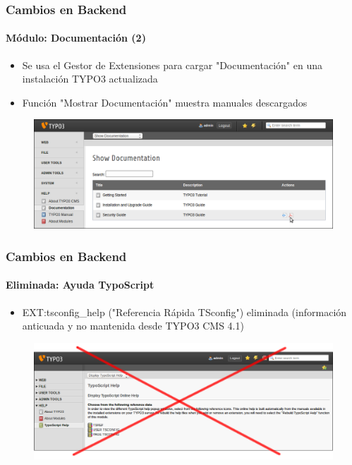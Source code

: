 \begin{frame}[fragile]
	\frametitle{Cambios en Backend}
	\framesubtitle{Módulo: Documentación (2)}

	\begin{itemize}
		\item Se usa el Gestor de Extensiones para cargar "Documentación" en una instalación TYPO3 actualizada
		\item Función "Mostrar Documentación" muestra manuales descargados
	\end{itemize}

	\begin{figure}
		\includegraphics[width=0.95\linewidth]{Images/BackendChanges/ShowDocumentation.png}
	\end{figure}

\end{frame}


\begin{frame}[fragile]
	\frametitle{Cambios en Backend}
	\framesubtitle{Eliminada: Ayuda TypoScript}

 	\begin{itemize}
		\item EXT:tsconfig\_help ("Referencia Rápida TSconfig") eliminada\newline
			\small(información anticuada y no mantenida desde TYPO3 CMS 4.1)
	\end{itemize}

	\begin{figure}
		\includegraphics[width=0.95\linewidth]{Images/BackendChanges/TypoScriptHelpRemovedCrossed.png}
	\end{figure}

\end{frame}


